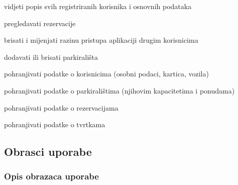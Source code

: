 \begin{packed_enum}
	\begin{packed_enum}
		
		\item vidjeti popis svih registriranih korisnika i osnovnih podataka
		\item pregledavati rezervacije
		\item brisati i mijenjati razinu pristupa aplikaciji drugim korisnicima
		\item dodavati ili brisati parkirališta
		
	\end{packed_enum}
	
	\item {}
	
	\begin{packed_enum}
		
		\item pohranjivati podatke o korisnicima (osobni podaci, kartica, vozila)
		\item pohranjivati podatke o parkiralištima (njihovim kapacitetima i ponudama)
		\item pohranjivati podatke o rezervacijama
		\item pohranjivati podatke o tvrtkama
		
	\end{packed_enum}
\end{packed_enum}


\eject 



\subsection{Obrasci uporabe}

\subsubsection{Opis obrazaca uporabe}


\newcommand\showuccounter{\stepcounter{uccounter}\theuccounter}



